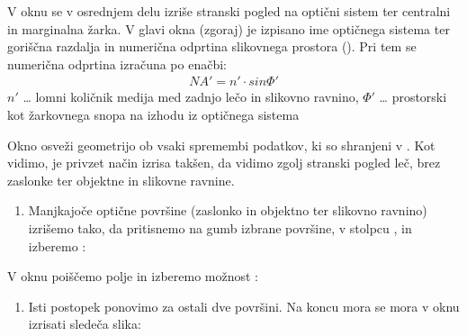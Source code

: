 \documentclass[letterpaper,10pt,english]{sphinxmanual}
\begin{document}
\begin{figure}[htbp]
\centering

\noindent{}
\end{figure}

\sphinxAtStartPar
V oknu se v osrednjem delu izriše stranski pogled na optični sistem ter centralni in marginalna žarka. V glavi okna (zgoraj) je izpisano ime optičnega sistema ter goriščna razdalja in numerična odprtina slikovnega prostora (). Pri tem se numerična odprtina izračuna po enačbi:
\begin{equation*}
\begin{split}NA' = n' \cdot sin{\Phi'}\end{split}
\end{equation*}
\sphinxAtStartPar
\({n}'\) … lomni količnik medija med zadnjo lečo in slikovno ravnino, \({\Phi}'\) … prostorski kot žarkovnega snopa na izhodu iz optičnega sistema

\sphinxAtStartPar
Okno  osveži geometrijo ob vsaki spremembi podatkov, ki so shranjeni v . Kot vidimo, je privzet način izrisa takšen, da vidimo zgolj stranski pogled leč, brez zaslonke ter objektne in slikovne ravnine.
\begin{enumerate}
%
\setcounter{enumi}{1}
\item {} 
\sphinxAtStartPar
Manjkajoče optične površine (zaslonko in objektno ter slikovno ravnino) izrišemo tako, da pritisnemo na gumb izbrane površine, v stolpcu , in izberemo :

\end{enumerate}

\begin{figure}[htbp]
\centering

\noindent{}
\end{figure}

\sphinxAtStartPar
V oknu  poiščemo polje  in izberemo možnost :

\begin{figure}[htbp]
\centering

\noindent{}
\end{figure}
\begin{enumerate}
%
\setcounter{enumi}{5}
\item {} 
\sphinxAtStartPar
Isti postopek ponovimo za ostali dve površini. Na koncu mora se mora v  oknu izrisati sledeča slika:

\end{enumerate}
\end{document}
